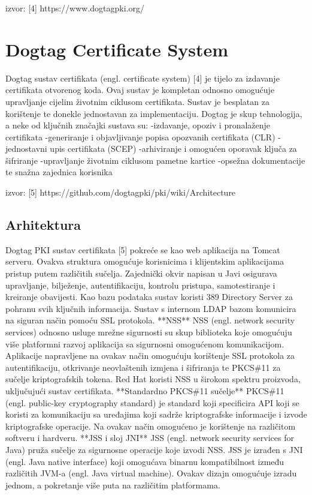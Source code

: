 \documentclass[]{foi}
\begin{document}
\cite{dogtagpki}
izvor: [4] https://www.dogtagpki.org/

\section{Dogtag Certificate System}

Dogtag sustav certifikata (engl. certificate system) [4] je tijelo za izdavanje certifikata otvorenog koda.
Ovaj sustav je kompletan odnosno omogućuje upravljanje cijelim životnim ciklusom certifikata.
Sustav je besplatan za korištenje te donekle jednostavan za implementaciju.
Dogtag je skup tehnologija, a neke od ključnih značajki sustava su:
-izdavanje, opoziv i pronalaženje certifikata
-generiranje i objavljivanje popisa opozvanih certifikata (CLR)
-jednostavni upis certifikata (SCEP)
-arhiviranje i omogućen oporavak ključa za šifriranje
-upravljanje životnim ciklusom pametne kartice
-opsežna dokumentacije te snažna zajednica korisnika

\cite{dogtagpki-architecture}
izvor: [5] https://github.com/dogtagpki/pki/wiki/Architecture

\subsection{Arhitektura}

Dogtag PKI sustav certifikata [5] pokreće se kao web aplikacija na Tomcat serveru.
Ovakva struktura omogućuje korisnicima i klijentskim aplikacijama pristup putem različitih sučelja.
Zajednički okvir napisan u Javi osigurava upravljanje, bilježenje, autentifikaciju, kontrolu pristupa, samotestiranje i kreiranje obavijesti.
Kao bazu podataka sustav koristi 389 Directory Server za pohranu svih ključnih informacija.
Sustav s internom LDAP bazom komunicira na siguran način pomoću SSL protokola.
**NSS**
NSS (engl. network security services) odnosno usluge mrežne sigurnosti su skup biblioteka koje omogućuju više platformni razvoj aplikacija sa sigurnosni omogućenom komunikacijom.
Aplikacije napravljene na ovakav način omogućuju korištenje SSL protokola za autentifikaciju, otkrivanje neovlaštenih izmjena i šifriranja te PKCS\#11 za sučelje kriptografskih tokena.
Red Hat koristi NSS u širokom spektru proizvoda, uključujući sustav certifikata.
**Standardno PKCS\#11 sučelje**
PKCS\#11 (engl. public-key cryptography standard) je standard koji specificira API koji se koristi za komunikaciju sa uređajima koji sadrže kriptografske informacije i izvode kriptografske operacije.
Na ovakav način omogućeno je korištenje na različitom softveru i hardveru.
**JSS i sloj JNI**
JSS (engl. network security services for Java) pruža sučelje za sigurnosne operacije koje izvodi NSS.
JSS je izrađen s JNI (engl. Java native interface) koji omogućava binarnu kompatibilnost između različitih JVM-a (engl. Java virtual machine).
Ovakav dizajn omogućuje izradu jednom, a pokretanje više puta na različitim platformama.
\end{document}
